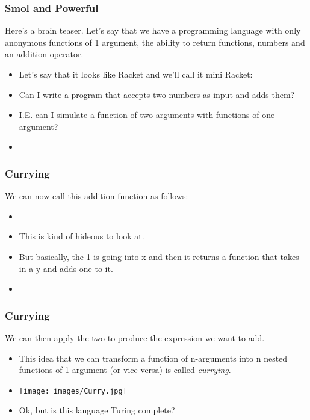 \documentclass{beamer}
\begin{document}
\begin{frame}
  \frametitle{Smol and Powerful}
  Here's a brain teaser. Let's say that we have a programming language with only anonymous functions of 1 argument, the ability to return functions, numbers and an
  addition operator.
  \begin{itemize}
  \item<2-> Let's say that it looks like Racket and we'll call it mini Racket:
    \miniRacket
  \item<3-> Can I write a program that accepts two numbers as input and adds them?
  \item<4-> I.E. can I simulate a function of two arguments with functions of one argument?
  \item<5-> \curry
  \end{itemize}
\end{frame}




\begin{frame}
  \frametitle{Currying}
  We can now call this addition function as follows:
  \begin{itemize}
  \item<2-> \curryApp
  \item<3-> This is kind of hideous to look at.
  \item<4-> But basically, the 1 is going into x and then it returns a function that takes in a y
    and adds one to it.
  \item<5-> \curryAppOne
  \end{itemize}
\end{frame}


\begin{frame}
  \frametitle{Currying}
  We can then apply the two to produce the expression we want to add.
  \curryAppTwo
  \begin{itemize}
  \item<2-> This idea that we can transform a function of n-arguments into n nested functions
    of 1 argument (or vice versa) is called \emph{currying}.
  \item<3-> \texttt{[image: images/Curry.jpg]}
  \item<4-> Ok, but is this language Turing complete?
  \end{itemize}
\end{frame}
\end{document}
